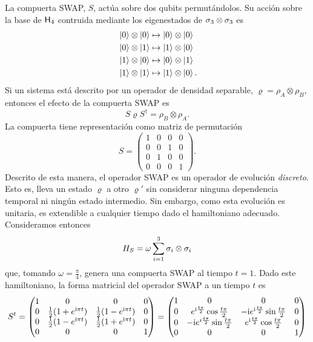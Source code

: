 La compuerta SWAP, $S$, actúa sobre dos qubits permutándolos. Su acción sobre la base de ${\sf H}_{4}$ contruida mediante los eigenestados de $\sigma_{3}\otimes\sigma_{3}$ es
\begin{align}
    \ket{0}\otimes\ket{0}&\mapsto\ket{0}\otimes\ket{0}\nonumber\\
    \ket{0}\otimes\ket{1}&\mapsto\ket{1}\otimes\ket{0}\nonumber\\
    \ket{1}\otimes\ket{0}&\mapsto\ket{0}\otimes\ket{1}\nonumber\\
    \ket{1}\otimes\ket{1}&\mapsto\ket{1}\otimes\ket{0} \rlap{.}\nonumber
\end{align}
Si un sistema está descrito por un operador de densidad separable, $\varrho=\rho_{A}\otimes\rho_{B}$, entonces el efecto de la compuerta SWAP es 
\begin{equation}
    S\varrho S^{\dag}=\rho_{B}\otimes\rho_{A}.\nonumber
\end{equation}
La compuerta tiene representación como matriz de permutación
\begin{equation}
    S=\begin{pmatrix}
        1&0&0&0\\
        0&0&1&0\\
        0&1&0&0\\
        0&0&0&1
    \end{pmatrix}.\nonumber
\end{equation}
Descrito de esta manera, el operador SWAP es un operador de evolución \textit{discreto}. Esto es, lleva un estado $\varrho$ a otro $\varrho'$ sin considerar ninguna dependencia temporal ni ningún estado intermedio. Sin embargo, como esta evolución es unitaria, es extendible a cualquier tiempo dado el hamiltoniano adecuado. Consideramos entonces
\begin{equation}
  H_{S}=\omega\sum_{i=1}^{3}\sigma_{i}\otimes\sigma_{i}\nonumber
\end{equation}
que, tomando $\omega=\frac{\pi}{4}$, genera una compuerta SWAP al tiempo $t=1$. Dado este hamiltoniano, la forma matricial del operador \textsc{SWAP} a un tiempo $t$ es
\begin{equation}\label{eq:SWAP(t)}
S^{t}=\begin{pmatrix}
 1 & 0 & 0 & 0 \\
 0 & \frac{1}{2}(1+e^{\text{i} \pi t}) & \frac{1}{2} (1-e^{\text{i} \pi t}) & 0 \\
 0 & \frac{1}{2}(1-e^{\text{i} \pi t}) & \frac{1}{2}(1+e^{\text{i} \pi t}) & 0 \\
 0 & 0 & 0 & 1
\end{pmatrix}=\begin{pmatrix}
  1 & 0 & 0 & 0 \\
  0 & e^{\text{i}\frac{t\pi}{2}}\cos{\frac{t\pi}{2}} & -\text{i} e^{\text{i}\frac{t\pi}{2}}\sin{\frac{t\pi}{2}} & 0 \\
  0 & -\text{i} e^{i\frac{t\pi}{2}}\sin{\frac{t\pi}{2}} & e^{\text{i}\frac{t\pi}{2}}\cos{\frac{t\pi}{2}}  & 0 \\
  0 & 0 & 0 & 1
 \end{pmatrix}
\end{equation}

